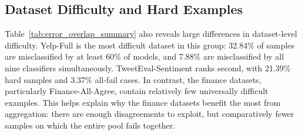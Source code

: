 \documentclass[conference]{IEEEtran}
\begin{document}
\begin{table}[H]
\centering
\footnotesize
\caption{Error-overlap summary by dataset. ``Within'' and ``Between'' denote the mean pairwise Jaccard similarity of model error sets for pairs from the same family and from different families, respectively. ``Hard'' counts samples misclassified by at least 60\% of models.}
\label{tab:error_overlap_summary}
\end{table}

\subsection{Dataset Difficulty and Hard Examples}

Table~\ref{tab:error_overlap_summary} also reveals large differences in dataset-level difficulty. Yelp-Full is the most difficult dataset in this group: 32.84\% of samples are misclassified by at least 60\% of models, and 7.88\% are misclassified by all nine classifiers simultaneously. TweetEval-Sentiment ranks second, with 21.39\% hard samples and 3.37\% all-fail cases. In contrast, the finance datasets, particularly Finance-All-Agree, contain relatively few universally difficult examples. This helps explain why the finance datasets benefit the most from aggregation: there are enough disagreements to exploit, but comparatively fewer samples on which the entire pool fails together.
\end{document}
